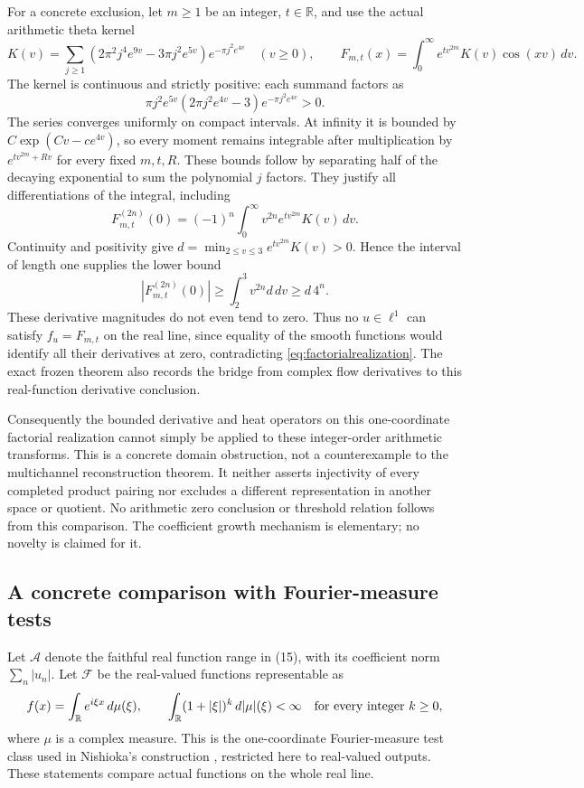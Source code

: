 \documentclass[11pt]{article}
\theoremstyle{remark}\newtheorem{remark}[theorem]{Remark}
\newcommand{\R}{\mathbb R}\newcommand{\N}{\mathbb N}
\begin{document}
For a concrete exclusion, let $m\geq1$ be an integer, $t\in\R$,
and use the actual arithmetic theta kernel
\[
 K(v)=\sum_{j\geq1}(2\pi^2j^4e^{9v}-3\pi j^2e^{5v})
                         e^{-\pi j^2e^{4v}}\quad(v\geq0),
 \qquad
 F_{m,t}(x)=\int_0^\infty e^{tv^{2m}}K(v)\cos(xv)\,dv.
\]
The kernel is continuous and strictly positive: each summand factors as
\[
 \pi j^2e^{5v}(2\pi j^2e^{4v}-3)e^{-\pi j^2e^{4v}}>0.
\]
The series converges uniformly on compact intervals. At infinity
it is bounded by $C\exp(Cv-c e^{4v})$, so every moment remains
integrable after multiplication by $e^{tv^{2m}+R v}$ for every
fixed $m,t,R$. These bounds follow by separating half of the
decaying exponential to sum the polynomial $j$ factors. They
justify all differentiations of the integral, including
\begin{equation}\label{eq:arithmeticderivatives}
 F_{m,t}^{(2n)}(0)=(-1)^n\int_0^\infty
                   v^{2n}e^{tv^{2m}}K(v)\,dv.
\end{equation}
Continuity and positivity give
$d=\min_{2\leq v\leq3}e^{tv^{2m}}K(v)>0$. Hence the interval
of length one supplies the lower bound
\[
 |F_{m,t}^{(2n)}(0)|\geq\int_2^3 v^{2n}d\,dv\geq d\,4^n.
\]
These derivative magnitudes do not even tend to zero. Thus no
$u\in\ell^1$ can satisfy $f_u=F_{m,t}$ on the real line,
since equality of the smooth functions would identify all their
derivatives at zero, contradicting \eqref{eq:factorialrealization}.
The exact frozen theorem also records the bridge from complex
flow derivatives to this real-function derivative conclusion.

Consequently the bounded derivative and heat operators on this
one-coordinate factorial realization cannot simply be applied to
these integer-order arithmetic transforms. This is a concrete
domain obstruction, not a counterexample to the multichannel
reconstruction theorem. It neither asserts injectivity of every
completed product pairing nor excludes a different representation
in another space or quotient. No arithmetic zero conclusion or
threshold relation follows from this comparison. The coefficient
growth mechanism is elementary; no novelty is claimed for it.

\subsection{A concrete comparison with Fourier-measure tests}
Let $\mathcal A$ denote the faithful real function range in (15),
with its coefficient norm $\sum_n|u_n|$. Let $\mathcal F$ be the
real-valued functions representable as
\[
 f(x)=\int_\R e^{i\xi x}\,d\mu(\xi),\qquad
 \int_\R(1+|\xi|)^k\,d|\mu|(\xi)<\infty
 \quad\hbox{for every integer }k\geq0,
\]
where $\mu$ is a complex measure. This is the one-coordinate
Fourier-measure test class used in Nishioka's construction
\cite[Section 2]{nishioka}, restricted here to real-valued outputs.
These statements compare actual functions on the whole real line.
\end{document}
